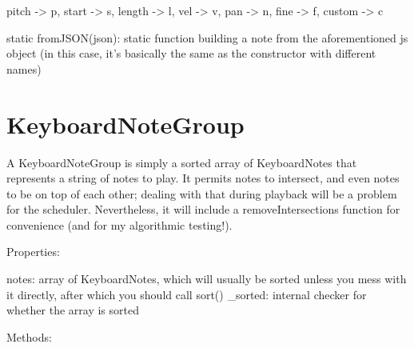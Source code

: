\documentclass{article}
\begin{document}
pitch -> p, start -> s, length -> l, vel -> v, pan -> n, fine -> f, custom -> c

static fromJSON(json): static function building a note from the aforementioned js object (in this case, it's basically the same as the constructor with different names)

\section{KeyboardNoteGroup}

A KeyboardNoteGroup is simply a sorted array of KeyboardNotes that represents a string of notes to play. It permits notes to intersect, and even notes to be on top of each other; dealing with that during playback will be a problem for the scheduler. Nevertheless, it will include a removeIntersections function for convenience (and for my algorithmic testing!).

Properties:

notes: array of KeyboardNotes, which will usually be sorted unless you mess with it directly, after which you should call sort()
_sorted: internal checker for whether the array is sorted

Methods:
\end{document}
